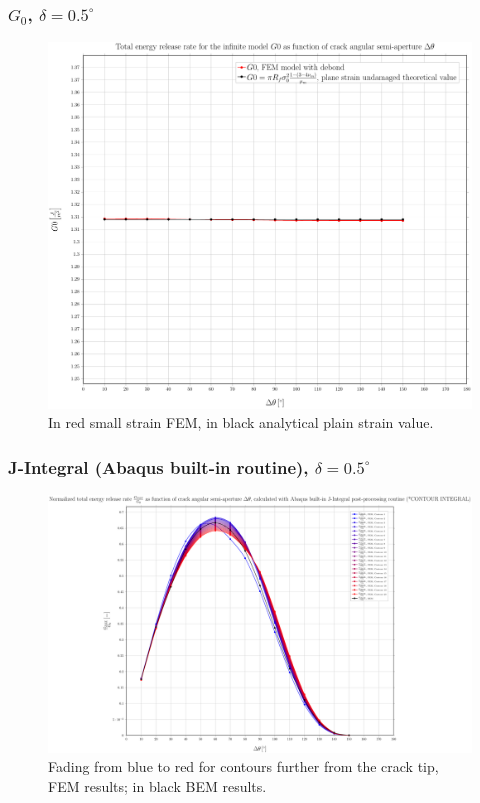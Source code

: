 \documentclass[first,firstsupp,lastsupp,handout,last,hyperref,table]{ETHclass}
\begin{document}
\begin{frame}
\frametitle{\small $G_{0}$, $\delta=0.5^{\circ}$}
\vspace{-0.5cm}
\centering
\captionsetup[figure]{font=scriptsize,labelfont=scriptsize}
\begin{figure}[!h]
\centering
\includegraphics[height=0.7\textheight]{2017-07-10_AbqRunSummary_SmallStrainD05_G0_Summary.pdf}
  \caption{\scriptsize In red small strain FEM, in black analytical plain strain value.}
  \label{fig:res1}
\end{figure}
\end{frame}

\begin{frame}
\frametitle{\small J-Integral (Abaqus built-in routine), $\delta=0.5^{\circ}$}
\vspace{-0.5cm}
\centering
\captionsetup[figure]{font=scriptsize,labelfont=scriptsize}
\begin{figure}[!h]
\centering
\includegraphics[height=0.7\textheight]{2017-07-10_AbqRunSummary_SmallStrainD05_J-INT_Summary.pdf}
  \caption{\scriptsize Fading from blue to red for contours further from the crack tip, FEM results; in black BEM results.}
  \label{fig:res1}
\end{figure}
\end{frame}
\end{document}
